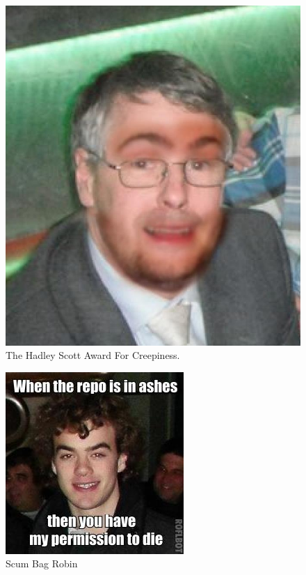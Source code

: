 \documentclass[11pt]{report}
\begin{document}
\begin{figure}[h]
\begin{center}
\includegraphics[scale=0.4]{./design/542749_10151334664783073_750339761_n} 
\end{center}
\caption{The Hadley Scott Award For Creepiness.}
\label{fig:the hadley scott award for creepiness}
\end{figure} 

\begin{figure}[h]
\begin{center}
\includegraphics[scale=0.4]{./design/banerobin} 
\end{center}
\caption{Scum Bag Robin}
\label{fig:scum bag robin}
\end{figure}
\end{document}
